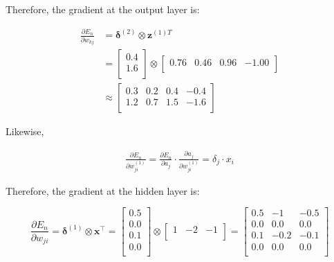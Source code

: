 \begin{solution}
    Therefore, the gradient at the output layer is:

    \[
        \begin{align*}
            \frac{\partial E_n}{\partial w_{kj}}
            &= \bm{\delta}^{(2)} \otimes \mathbf{z}^{(1)T} \\
            &=
            \begin{bmatrix}
                0.4 \\
                1.6 \\
            \end{bmatrix}
            \otimes
            \begin{bmatrix}
                0.76  & 0.46 & 0.96 & -1.00 \\
            \end{bmatrix} \\
            &\approx
            \begin{bmatrix}
                0.3 & 0.2 & 0.4 & -0.4 \\
                1.2 & 0.7 & 1.5 & -1.6 \\
            \end{bmatrix}
        \end{align*}
    \]

    Likewise,

    \[
        \begin{align*}
            \frac{\partial E_n}{\partial w^{(1)}_{ji}}
            = \frac{\partial E_n}{\partial a_j} \cdot \frac{\partial a_j}{ \partial w^{(1)}_{ji} }
            = \delta_j \cdot x_i
        \end{align*}
    \]

    Therefore, the gradient at the hidden layer is:

    \[
        \frac{\partial E_n}{\partial w_{ji}}
        = \bm{\delta}^{(1)} \otimes \mathbf{x}^\intercal
        =
        \begin{bmatrix}
            0.5 \\
            0.0 \\
            0.1 \\
            0.0 \\
        \end{bmatrix}
        \otimes
        \begin{bmatrix}
            1  & -2 & -1\\
        \end{bmatrix}
        =
        \begin{bmatrix}
            0.5 & -1   & -0.5 \\
            0.0 & 0.0  & 0.0  \\
            0.1 & -0.2 & -0.1 \\
            0.0 & 0.0  & 0.0  \\
        \end{bmatrix}
    \]

\end{solution}
